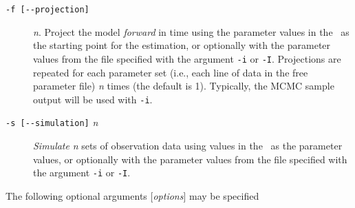 \begin{description}
\item [\texttt{-f [-{}-projection]}] \emph{n}. Project the model \emph{forward} in time using the parameter values in the \config\ as the starting point for the estimation, or optionally with the parameter values from the file specified with the argument \texttt{-i} or \texttt{-I}. Projections are repeated for each parameter set (i.e., each line of data in the free parameter file) \emph{n} times (the default is 1). Typically, the MCMC sample output will be used with \texttt{-i}.
\item [\texttt{-s [-{}-simulation]} \emph{n}] \emph{Simulate} \emph{n} sets of observation data using values in the \config\ as the parameter values, or optionally with the parameter values from the file specified with the argument \texttt{-i} or \texttt{-I}.

\end{description}

The following optional arguments [\emph{options}] may be specified

